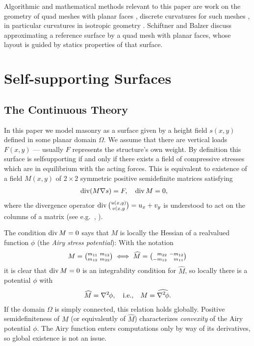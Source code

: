 \documentclass[review]{acmsiggraph}
\def\wh{\widehat}
\def\Div{\mathop{{\rm div}}\nolimits}
\def\ess{s}
\def\Hess#1{{\def\testess{#1}\nabla^2\ifx\testess\ess\!s\else #1\fi}}
\def\Hess#1{\text{$\nabla^2\hskip-.2ex #1$}}
\begin{document}
Algorithmic and mathematical methods relevant to this paper are work on 
the geometry of quad meshes with planar faces \cite{Glymph2004,Liu2006}, 
discrete curvatures for such meshes \cite{Pottmann2007b,bobenko-2010-ct}, 
in particular curvatures in isotropic geometry \cite{Pottmann2007}. 
Schiftner and Balzer  discuss approximating a 
reference surface by a quad mesh with planar faces, whose layout is guided 
by statics properties of that surface.


\section{Self-supporting Surfaces}

\subsection{The Continuous Theory}

In this paper we model masonry as a surface given by a height field $s(x,y)$ 
defined in some planar domain $\Omega$. We assume that there are vertical 
loads $F(x,y)$ --- usually $F$ represents the structure's own weight. By 
definition this surface is self\dash supporting if and only if there 
exists a field of compressive stresses which are in equilibrium with the 
acting forces. This is equivalent to existence of a field $M(x,y)$ of 
$2\times 2$ symmetric positive semidefinite matrices satisfying
	\begin{align}
	\Div (M\nabla s) = F, \quad
	\Div M &= 0,
	  \label{eq:conds}
	\end{align}
 where the divergence operator $\Div{u(x,y)\choose v(x,y}= u_x + v_y$ is 
understood to act on the columns of a matrix (see e.g.\ 
\cite{Fraternali2010}, \cite{Giaquinta1985}).

The condition $\Div M=0$ says that $M$ is locally the Hessian of a 
real\dash valued function $\phi$ (the {\em Airy stress potential}): With 
the notation
	\begin{align*}
	M =
	{\textstyle {m_{11} \ m_{12} \choose m_{12} \ m_{22}}}
	\iff	
	\wh M =
	{\textstyle {\hphantom{-}m_{22} \ -m_{12} \choose -m_{12}
		 \ \hphantom{-}m_{11}}}
	\end{align*}
 it is clear that $\Div M=0$ is an integrability condition for $\wh M$, so
locally there is a potential $\phi$ with
	\begin{align*}
	\wh M = \Hess\phi, \quad \text{i.e.,}\quad
	M = \wh{\Hess\phi}.
	\end{align*}
 If the domain $\Omega$ is simply connected, this relation holds globally. 
Positive semidefiniteness of $M$ (or equivalently of $\wh M$) 
characterizes {\em convexity} of the Airy potential $\phi$. The Airy 
function enters computations only by way of its derivatives, so global 
existence is not an issue.
\end{document}
